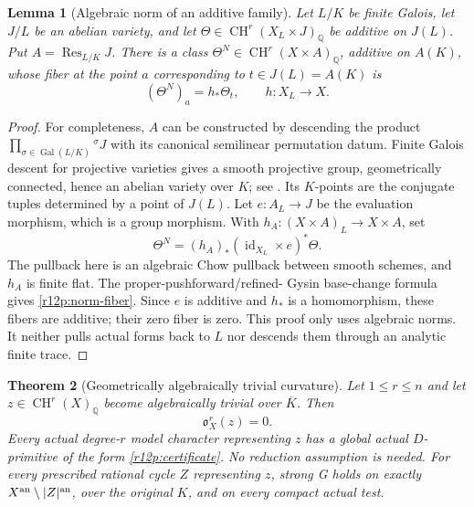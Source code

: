 \documentclass[11pt]{article}
\newtheorem{theorem}{Theorem}[section]
\newtheorem{lemma}[theorem]{Lemma}
\theoremstyle{definition}
\theoremstyle{remark}
\numberwithin{equation}{section}
\begin{document}
\begin{lemma}[Algebraic norm of an additive family]
\label{r12p:norm-family}
Let $L/K$ be finite Galois, let $J/L$ be an abelian variety, and let
$\Theta\in\operatorname{CH}^r(X_L\times J)_{\mathbb Q}$ be
additive on $J(L)$.  Put $A=\operatorname{Res}_{L/K}J$.
There is a class
$\Theta^N\in\operatorname{CH}^r(X\times A)_{\mathbb Q}$,
additive on $A(K)$, whose fiber at the point $a$ corresponding to
$t\in J(L)=A(K)$ is
\[
                    (\Theta^N)_a=h_*\Theta_t,
                    \qquad h:X_L\longrightarrow X.
\tag{R12.P10}\label{r12p:norm-fiber}
\]
\end{lemma}

\begin{proof}
For completeness, $A$ can be constructed by descending the product
$\prod_{\sigma\in\operatorname{Gal}(L/K)}{}^\sigma J$ with its
canonical semilinear permutation datum.  Finite Galois descent for
projective varieties gives a smooth projective group, geometrically
connected, hence an abelian variety over $K$; see
\cite[Proposition 1.8]{MilneJV}.  Its $K$-points are the conjugate
tuples determined by a point of $J(L)$.  Let $e:A_L\to J$ be the
evaluation morphism, which is a group morphism.  With
$h_A:(X\times A)_L\to X\times A$, set
\[
 \Theta^N=(h_A)_*(\operatorname{id}_{X_L}\times e)^*\Theta.
\tag{R12.P11}\label{r12p:norm-family-formula}
\]
The pullback here is an algebraic Chow pullback between smooth
schemes, and $h_A$ is finite flat.  The proper-pushforward/refined-
Gysin base-change formula gives \eqref{r12p:norm-fiber}.
Since $e$ is additive and $h_*$ is a homomorphism, these fibers are
additive; their zero fiber is zero.  This proof only uses algebraic
norms.  It neither pulls actual forms back to $L$ nor descends them
through an analytic finite trace.
\end{proof}

\begin{theorem}[Geometrically algebraically trivial curvature]
\label{r12p:geometric-algebraic}
Let $1\leq r\leq n$ and let
$z\in\operatorname{CH}^r(X)_{\mathbb Q}$ become algebraically
trivial over $\overline K$.  Then
\[
                              \mathfrak o_X^r(z)=0.
\tag{R12.P12}\label{r12p:alg-zero}
\]
Every actual degree-$r$ model character representing $z$ has a
global actual $D$-primitive of the form
\eqref{r12p:certificate}.  No reduction assumption is needed.
For every prescribed rational cycle $Z$ representing $z$, strong G
holds on exactly $X^{\rm an}\setminus|Z|^{\rm an}$, over the
original $K$, and on every compact actual test.
\end{theorem}
\end{document}
